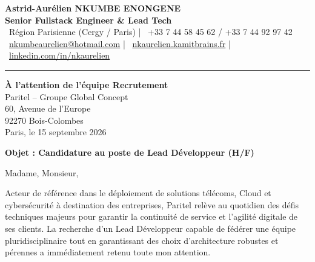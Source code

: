 \documentclass[10.5pt,a4paper]{article}
\begin{document}
{\LARGE \textbf{\color{primary}Astrid-Aurélien NKUMBE ENONGENE}}\\[0.2em]
{\large \textbf{\color{darkgray}Senior Fullstack Engineer \& Lead Tech}}\\[0.4em]
{\small \color{lightgray}
\faMapMarker*\ Région Parisienne (Cergy / Paris) \quad|\quad
\faPhone*\ +33 7 44 58 45 62 / +33 7 44 92 97 42\\[0.15em]
\faEnvelope\ \href{mailto:nkumbeaurelien@hotmail.com}{nkumbeaurelien@hotmail.com} \quad|\quad
\faGlobe\ \href{https://nkaurelien.kamitbrains.fr}{nkaurelien.kamitbrains.fr} \quad|\quad
\faLinkedin\ \href{https://www.linkedin.com/in/nkaurelien/}{linkedin.com/in/nkaurelien}
}

\vspace{0.4em}
\textcolor{rulecolor}{\rule{\linewidth}{1pt}}
\vspace{0.6em}

\begin{flushright}
    \textbf{À l’attention de l’équipe Recrutement}\\[0.15em]
    Paritel – Groupe Global Concept\\[0.15em]
    60, Avenue de l’Europe\\[0.15em]
    92270 Bois-Colombes\\[0.5em]
    {\small \color{lightgray} Paris, le 15 septembre 2026}
\end{flushright}

\vspace{0.4em}

\textbf{\color{primary}Objet : Candidature au poste de Lead Développeur (H/F)}

\vspace{0.5em}

Madame, Monsieur,

Acteur de référence dans le déploiement de solutions télécoms, Cloud et cybersécurité à destination des entreprises, Paritel relève au quotidien des défis techniques majeurs pour garantir la continuité de service et l'agilité digitale de ses clients. La recherche d'un Lead Développeur capable de fédérer une équipe pluridisciplinaire tout en garantissant des choix d'architecture robustes et pérennes a immédiatement retenu toute mon attention.
\end{document}
